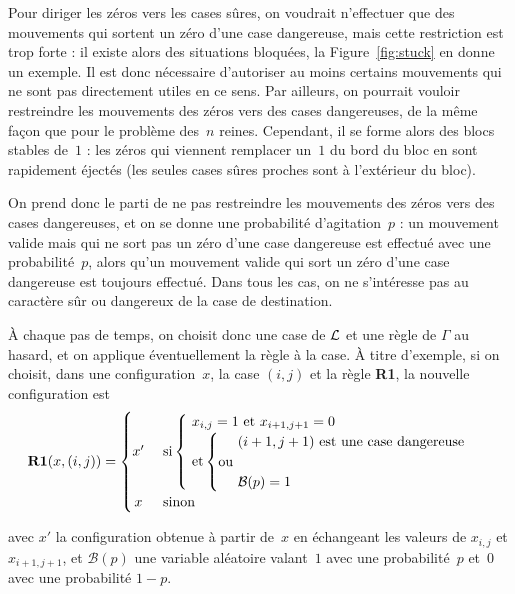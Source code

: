 Pour diriger les zéros vers les cases sûres, on voudrait n'effectuer que des mouvements qui sortent un zéro d'une case dangereuse, mais cette restriction est trop forte : il existe alors des situations bloquées, la Figure~\ref{fig:stuck} en donne un exemple. Il est donc nécessaire d'autoriser au moins certains mouvements qui ne sont pas directement utiles en ce sens. Par ailleurs, on pourrait vouloir restreindre les mouvements des zéros vers des cases dangereuses, de la même façon que pour le problème des~$n$ reines. Cependant, il se forme alors des blocs stables de~$1$ : les zéros qui viennent remplacer un~$1$ du bord du bloc en sont rapidement éjectés (les seules cases sûres proches sont à l'extérieur du bloc). 

On prend donc le parti de ne pas restreindre les mouvements des zéros vers des cases dangereuses, et on se donne une probabilité d'agitation~$p$ : un mouvement valide mais qui ne sort pas un zéro d'une case dangereuse est effectué avec une probabilité~$p$, alors qu'un mouvement valide qui sort un zéro d'une case dangereuse est toujours effectué. Dans tous les cas, on ne s'intéresse pas au caractère sûr ou dangereux de la case de destination. 




À chaque pas de temps, on choisit donc une case de $\mathcal{L}$ et une règle de $\Gamma$ au hasard, et on applique éventuellement la règle à la case. À titre d'exemple, si on choisit, dans une configuration~$x$, la case $(i,j)$ et la règle \textbf{R1}, la nouvelle configuration est \[
\textbf{R1}(x,(i,j))=
\begin{cases}
  \hfill x' \hfill & \text{ si}  \begin{cases}\text{ $x_{i,j}=1$ et $x_{i+1,j+1}=0$ }\\
    \text{ et}  \left\{
        \begin{tabular}{@{}c@{}l}
          &\text{ $(i+1,j+1)$ est une case dangereuse}\\
          \text {ou}&\\
          &\text{ $\mathcal{B}(p)=1$}\\
        \end{tabular}
      \right.
  \end{cases}
  \\
  \hfill x \hfill & \text{ sinon}
\end{cases}
\]

avec $x'$ la configuration obtenue à partir de~$x$ en échangeant les valeurs de $x_{i,j}$ et $x_{i+1,j+1}$, et $\mathcal{B}(p)$ une variable aléatoire valant~$1$ avec une probabilité~$p$ et~$0$ avec une probabilité $1-p$.

